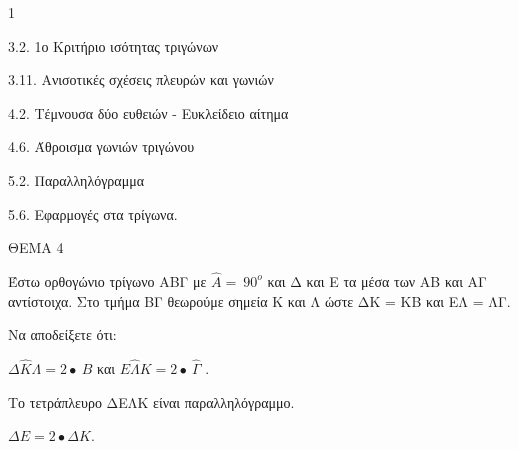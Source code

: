 \begin{ylh}{1}
    \item 3.2. 1ο Κριτήριο ισότητας τριγώνων
    \item 3.11. Ανισοτικές σχέσεις πλευρών και γωνιών
    \item 4.2. Τέμνουσα δύο ευθειών - Ευκλείδειο αίτημα
    \item 4.6. Άθροισμα γωνιών τριγώνου
    \item 5.2. Παραλληλόγραμμα
    \item 5.6. Εφαρμογές στα τρίγωνα.
\end{ylh}

ΘΕΜΑ 4

Έστω ορθογώνιο τρίγωνο ΑΒΓ με $\widehat{Α} = \ 90^{ο}$ και Δ και Ε τα μέσα των ΑΒ και ΑΓ αντίστοιχα. Στο τμήμα ΒΓ θεωρούμε σημεία Κ και Λ ώστε ΔΚ = ΚΒ και ΕΛ = ΛΓ.

Να αποδείξετε ότι:

\begin{alist}
\item $\Delta\widehat{Κ}\Lambda = 2 \bullet \ \widehat{Β}$ και $Ε\widehat{\Lambda}Κ = 2 \bullet \ \widehat{\Gamma}$ . 

\item Το τετράπλευρο ΔΕΛΚ είναι παραλληλόγραμμο. 

\item $\Delta Ε = 2 \bullet \Delta Κ$. 


\end{alist}
